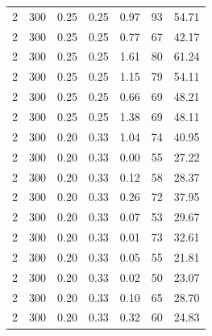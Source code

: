 \documentclass[12pt]{article}
\begin{document}
\begin{tabular}{rrrrrrr}
           2 &           300 &          0.25 &           0.25 &                    0.97 &               93 &                   54.71 \\
           2 &           300 &          0.25 &           0.25 &                    0.77 &               67 &                   42.17 \\
           2 &           300 &          0.25 &           0.25 &                    1.61 &               80 &                   61.24 \\
           2 &           300 &          0.25 &           0.25 &                    1.15 &               79 &                   54.11 \\
           2 &           300 &          0.25 &           0.25 &                    0.66 &               69 &                   48.21 \\
           2 &           300 &          0.25 &           0.25 &                    1.38 &               69 &                   48.11 \\
           2 &           300 &          0.20 &           0.33 &                    1.04 &               74 &                   40.95 \\
           2 &           300 &          0.20 &           0.33 &                    0.00 &               55 &                   27.22 \\
           2 &           300 &          0.20 &           0.33 &                    0.12 &               58 &                   28.37 \\
           2 &           300 &          0.20 &           0.33 &                    0.26 &               72 &                   37.95 \\
           2 &           300 &          0.20 &           0.33 &                    0.07 &               53 &                   29.67 \\
           2 &           300 &          0.20 &           0.33 &                    0.01 &               73 &                   32.61 \\
           2 &           300 &          0.20 &           0.33 &                    0.05 &               55 &                   21.81 \\
           2 &           300 &          0.20 &           0.33 &                    0.02 &               50 &                   23.07 \\
           2 &           300 &          0.20 &           0.33 &                    0.10 &               65 &                   28.70 \\
           2 &           300 &          0.20 &           0.33 &                    0.32 &               60 &                   24.83 \\
    \bottomrule
    \end{tabular}
\end{document}
